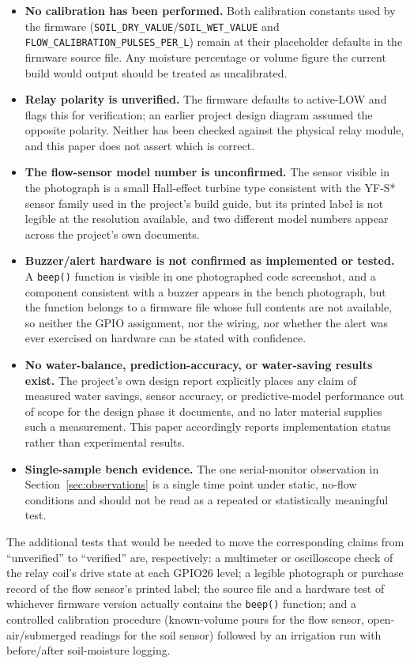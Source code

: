 \documentclass[conference]{IEEEtran}
\begin{document}
\begin{itemize}
\item \textbf{No calibration has been performed.} Both calibration
constants used by the firmware (\texttt{SOIL\_DRY\_VALUE}/\texttt{SOIL\_WET\_VALUE}
and \texttt{FLOW\_CALIBRATION\_PULSES\_PER\_L}) remain at their
placeholder defaults in the firmware source file. Any moisture
percentage or volume figure the current build would output should be
treated as uncalibrated.
\item \textbf{Relay polarity is unverified.} The firmware defaults to
active-LOW and flags this for verification; an earlier project design
diagram assumed the opposite polarity. Neither has been checked against
the physical relay module, and this paper does not assert which is
correct.
\item \textbf{The flow-sensor model number is unconfirmed.} The sensor
visible in the photograph is a small Hall-effect turbine type
consistent with the YF-S* sensor family used in the project's build
guide, but its printed label is not legible at the resolution available,
and two different model numbers appear across the project's own
documents.
\item \textbf{Buzzer/alert hardware is not confirmed as implemented or
tested.} A \texttt{beep()} function is visible in one photographed code
screenshot, and a component consistent with a buzzer appears in the bench
photograph, but the function belongs to a firmware file whose full contents
are not available, so neither the GPIO assignment, nor the wiring, nor
whether the alert was ever exercised on hardware can be stated with
confidence.
\item \textbf{No water-balance, prediction-accuracy, or water-saving
results exist.} The project's own design report explicitly places any
claim of measured water savings, sensor accuracy, or predictive-model
performance out of scope for the design phase it documents, and no
later material supplies such a measurement.
This paper accordingly reports implementation status rather than
experimental results.
\item \textbf{Single-sample bench evidence.} The one serial-monitor
observation in Section~\ref{sec:observations} is a single time point
under static, no-flow conditions and should not be read as a
repeated or statistically meaningful test.
\end{itemize}

The additional tests that would be needed to move the corresponding
claims from ``unverified'' to ``verified'' are, respectively: a
multimeter or oscilloscope check of the relay coil's drive state at
each GPIO26 level; a legible photograph or purchase record of the flow
sensor's printed label; the source file and a hardware test of whichever
firmware version actually contains the \texttt{beep()} function; and a
controlled calibration procedure (known-volume pours for the flow
sensor, open-air/submerged readings for the soil sensor) followed by an
irrigation run with before/after soil-moisture logging.
\end{document}
